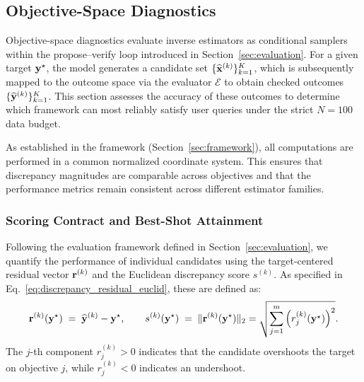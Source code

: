 \subsection{Objective-Space Diagnostics}\label{subsec:objective_diagnostics}

Objective-space diagnostics evaluate inverse estimators as conditional samplers within the propose--verify loop introduced in Section~\ref{sec:evaluation}. For a given target $\mathbf{y}^{\star}$, the model generates a candidate set $\{\widehat{\mathbf{x}}^{(k)}\}_{k=1}^{K}$, which is subsequently mapped to the outcome space via the evaluator $\mathcal{E}$ to obtain checked outcomes $\{\widehat{\mathbf{y}}^{(k)}\}_{k=1}^{K}$. This section assesses the accuracy of these outcomes to determine which framework can most reliably satisfy user queries under the strict $N=100$ data budget.

As established in the framework (Section~\ref{sec:framework}), all computations are performed in a common normalized coordinate system. This ensures that discrepancy magnitudes are comparable across objectives and that the performance metrics remain consistent across different estimator families.

\subsubsection{Scoring Contract and Best-Shot Attainment}\label{subsubsec:objective_contract}

Following the evaluation framework defined in Section~\ref{sec:evaluation}, we quantify the performance of individual candidates using the target-centered residual vector $\mathbf{r}^{(k)}$ and the Euclidean discrepancy score $s^{(k)}$. As specified in Eq.~\ref{eq:discrepancy_residual_euclid}, these are defined as:
\begin{equation}
  \mathbf{r}^{(k)}(\mathbf{y}^{\star}) \;=\; \widehat{\mathbf{y}}^{(k)} - \mathbf{y}^{\star}, \qquad s^{(k)}(\mathbf{y}^{\star}) \;=\; \lVert \mathbf{r}^{(k)}(\mathbf{y}^{\star}) \rVert_{2} = \sqrt{\sum_{j=1}^{m}\Big(r^{(k)}_{j}(\mathbf{y}^{\star})\Big)^{2}}.
\end{equation}
The $j$-th component $r^{(k)}_{j} > 0$ indicates that the candidate overshoots the target on objective $j$, while $r^{(k)}_{j} < 0$ indicates an undershoot.


